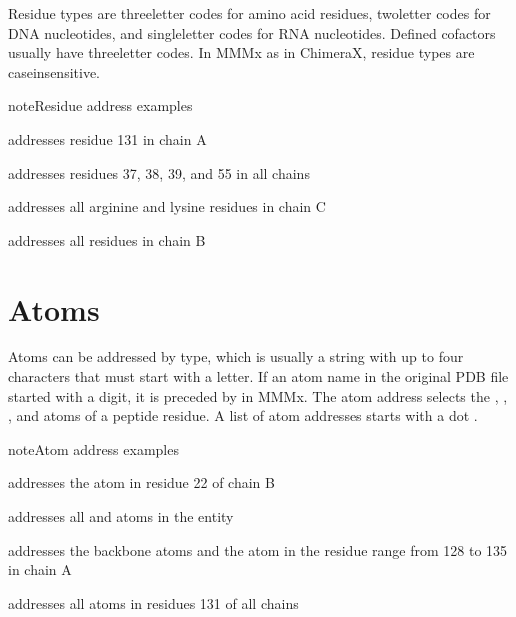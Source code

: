 \documentclass[letterpaper,10pt,english]{sphinxmanual}
\begin{document}
Residue types are three\sphinxhyphen{}letter codes for amino acid residues, two\sphinxhyphen{}letter codes for DNA nucleotides, and single\sphinxhyphen{}letter codes for RNA nucleotides. Defined cofactors usually have three\sphinxhyphen{}letter codes. In MMMx as in ChimeraX, residue types are case\sphinxhyphen{}insensitive.

\begin{sphinxadmonition}{note}{Residue address examples}

  addresses residue 131 in chain A

 addresses residues 37, 38, 39, and 55 in all chains

 addresses all arginine and lysine residues in chain C

 addresses all residues in chain B
\end{sphinxadmonition}


\section{Atoms}
\label{\detokenize{object_access:atoms}}
Atoms can be addressed by type, which is usually a string with up to four characters that must start with a letter.
If an atom name in the original PDB file started with a digit, it is preceded by  in MMMx.
The atom address  selects the , , , and  atoms of a peptide residue.
A list of atom addresses starts with a dot .

\begin{sphinxadmonition}{note}{Atom address examples}

  addresses the  atom in residue 22 of chain B

 addresses all  and  atoms in the entity

 addresses the backbone atoms and the  atom in the residue range from 128 to 135 in chain A

 addresses all atoms in residues 131 of all chains
\end{sphinxadmonition}
\end{document}

